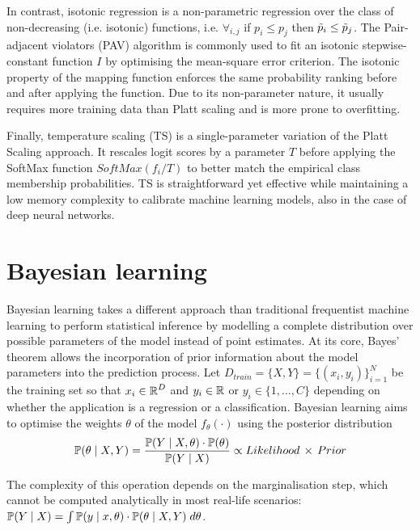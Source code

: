 In contrast, isotonic regression is a non-parametric regression over the class of non-decreasing (i.e. isotonic) functions, i.e. $\forall_{i,j}$ if $ p_i \leq p_j$ then $\Tilde p_i \leq \Tilde p_j$. The Pair-adjacent violators (PAV) algorithm is commonly used to fit an isotonic stepwise-constant function $I$ by optimising the mean-square error criterion. The isotonic property of the mapping function enforces the same probability ranking before and after applying the function. Due to its non-parameter nature, it usually requires more training data than Platt scaling and is more prone to overfitting.

Finally, temperature scaling (TS) is a single-parameter variation of the Platt Scaling approach. It rescales logit scores by a parameter $T$ before applying the SoftMax function $SoftMax(f_i / T) $ to better match the empirical class membership probabilities. TS is straightforward yet effective while maintaining a low memory complexity to calibrate machine learning models, also in the case of deep neural networks\cite{TSDeepNets}.



\section{Bayesian learning}

Bayesian learning takes a different approach than traditional frequentist machine learning to perform statistical inference by modelling a complete distribution over possible parameters of the model instead of point estimates. At its core, Bayes' theorem allows the incorporation of prior information about the model parameters into the prediction process. Let $D_{train} = \{X,Y\}= \{(x_i,y_i)\}_{i=1}^N$ be the training set so that $x_i \in \operatorname{\mathbb{R}}^D$ and $y_i \in \operatorname{\mathbb{R}}$ or $y_i \in \{1,\ldots,C\}$ depending on whether the application is a regression or a classification. Bayesian learning aims to optimise the weights $\theta$ of the model $f_\theta(\cdot)$ using the posterior distribution 
$$
\operatorname{\mathbb{P}}(\theta \mid X, Y) 
= \frac{\operatorname{\mathbb{P}}(Y \mid X, \theta) \cdot \operatorname{\mathbb{P}}(\theta) }{\operatorname{\mathbb{P}}(Y \mid X) }
\propto Likelihood \, \times \, Prior
$$

The complexity of this operation depends on the marginalisation step, which cannot be computed analytically in most real-life scenarios:
$
\operatorname{\mathbb{P}}(Y \mid X) = \int \operatorname{\mathbb{P}}(y \mid x, \theta) \cdot \operatorname{\mathbb{P}}(\theta \mid X,Y) \;d\theta
$.


